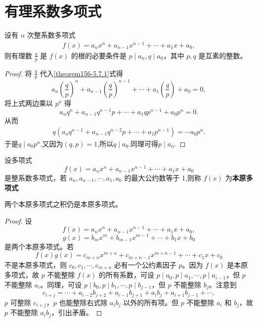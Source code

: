 \documentclass[../../main.tex]{subfiles}%
\begin{document}
\section{有理系数多项式}

\begin{theorem}[整数系数多项式有有理根的必要条件]\label{theorem:整数系数多项式有有理根的必要条件}
设有 \( n \) 次整系数多项式
\begin{align}
f(x) = a_n x^n + a_{n-1} x^{n-1} + \cdots + a_1 x + a_0, \label{theorem156-5.7.1}
\end{align}
则有理数 \( \frac{q}{p} \) 是 \( f(x) \) 的根的必要条件是 \( p \mid a_n, q \mid a_0 \)，其中 \( p, q \) 是互素的整数。
\end{theorem}
\begin{proof}

将 \( \frac{q}{p} \) 代入\eqref{theorem156-5.7.1}式得
\[
a_n \left( \frac{q}{p} \right)^n + a_{n-1} \left( \frac{q}{p} \right)^{n-1} + \cdots + a_1 \left( \frac{q}{p} \right) + a_0 = 0,
\]
将上式两边乘以 \( p^n \) 得
\[
a_n q^n + a_{n-1} q^{n-1} p + \cdots + a_1 q p^{n-1} + a_0 p^n = 0.
\]
从而
\begin{align*}
q\left( a_nq^{n-1}+a_{n-1}q^{n-2}p+\cdots +a_1p^{n-1} \right) =-a_0p^n.
\end{align*}
于是$q\mid a_0p^n$,又因为$(q,p)=1$,所以$q\mid a_0$.同理可得$p \mid a_n$.

\end{proof}

\begin{definition}[本原多项式]
设多项式
\[
f(x) = a_n x^n + a_{n-1} x^{n-1} + \cdots + a_1 x + a_0
\]
是整系数多项式，若 \( a_n, a_{n-1}, \cdots, a_1, a_0 \) 的最大公约数等于 1,则称 \( f(x) \) 为\textbf{本原多项式}.
\end{definition}

\begin{lemma}[Gauss引理]\label{lemma:Gauss引理}
两个本原多项式之积仍是本原多项式。
\end{lemma}
\begin{proof}

设
\[
f(x) = a_n x^n + a_{n-1} x^{n-1} + \cdots + a_1 x + a_0,
\]
\[
g(x) = b_m x^m + b_{m-1} x^{m-1} + \cdots + b_1 x + b_0
\]
是两个本原多项式。若
\[
f(x) g(x) = c_{m+n} x^{m+n} + c_{m+n-1} x^{m+n-1} + \cdots + c_1 x + c_0
\]
不是本原多项式，则 \( c_0, c_1, \cdots, c_{m+n} \) 必有一个公约素因子 \( p \)。因为 \( f(x) \) 是本原多项式，故 \( p \) 不能整除 \( f(x) \) 的所有系数，可设 \( p \mid a_0, p \mid a_1, \cdots, p \mid a_{i-1} \)，但 \( p \) 不能整除 \( a_i \)。同理，可设 \( p \mid b_0, p \mid b_1, \cdots, p \mid b_{j-1} \)，但 \( p \) 不能整除 \( b_j \)。注意到
\[
c_{i+j} = \cdots + a_{i-2} b_{j+2} + a_{i-1} b_{j+1} + a_i b_j + a_{i+1} b_{j-1} + \cdots,
\]
\( p \) 可整除 \( c_{i+j} \)，\( p \) 也能整除右式除 \( a_i b_j \) 以外的所有项。但 \( p \) 不能整除 \( a_i \) 和 \( b_j \)，故 \( p \) 不能整除 \( a_i b_j \)，引出矛盾。

\end{proof}
\end{document}
